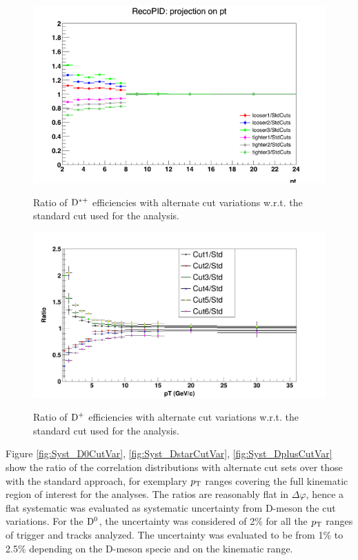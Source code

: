 \begin{figure}[h]
\centering
{\includegraphics[width=.7\linewidth]{figures/Systematics/Dstar/CutVar/RatioPromptEff1DMap.png}}
\caption{Ratio of ${\rm D^{*+}}$ efficiencies with alternate cut variations w.r.t. the standard cut used for the analysis.}
\label{fig:DstareffVars}
\end{figure}


\begin{figure}[!htbp]
\centering
{\includegraphics[width=0.70\linewidth, height=0.43\linewidth]{figures/Systematics/Dplus/Eff/EffcmpratioDplus.png}}
\caption{Ratio of ${\rm D^+}$ efficiencies with alternate cut variations w.r.t. the standard cut used for the analysis.}
\label{fig:DpluseffVars}
\end{figure}

Figure \ref{fig:Syst_D0CutVar}, \ref{fig:Syst_DstarCutVar}, \ref{fig:Syst_DplusCutVar} show the ratio of the correlation distributions with alternate cut sets over those with the standard approach, for exemplary $p_{\rm T}$ ranges covering the full kinematic region of interest for the analyses. The ratios are reasonably flat in $\Delta\varphi$, hence a flat systematic was evaluated as systematic uncertainty from D-meson the cut variations. For the ${\rm D^0}$, the uncertainty was considered of 2\% for all the $p_{\rm T}$ ranges of trigger and tracks analyzed. The uncertainty was evaluated to be from 1\% to 2.5\% depending on the D-meson specie and on the kinematic range.

